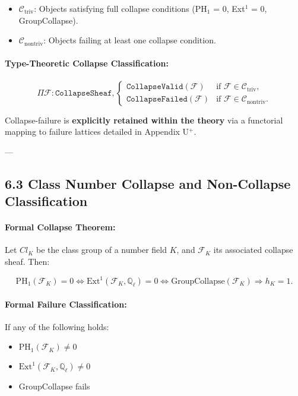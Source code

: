\documentclass[11pt]{article}
\begin{document}
\begin{itemize}
    \item \( \mathcal{C}_{\mathrm{triv}} \): Objects satisfying full collapse conditions (PH$_1$ = 0, Ext$^1$ = 0, GroupCollapse).
    \item \( \mathcal{C}_{\mathrm{nontriv}} \): Objects failing at least one collapse condition.
\end{itemize}

\paragraph{Type-Theoretic Collapse Classification:}

\[
\Pi \mathcal{F} : \texttt{CollapseSheaf},
\begin{cases}
\texttt{CollapseValid}(\mathcal{F}) & \text{if } \mathcal{F} \in \mathcal{C}_{\mathrm{triv}}, \\
\texttt{CollapseFailed}(\mathcal{F}) & \text{if } \mathcal{F} \in \mathcal{C}_{\mathrm{nontriv}}.
\end{cases}
\]

Collapse-failure is \textbf{explicitly retained within the theory} via a functorial mapping to failure lattices detailed in Appendix U$^{+}$.

---

\subsection*{6.3 Class Number Collapse and Non-Collapse Classification}

\paragraph{Formal Collapse Theorem:}
Let \( Cl_K \) be the class group of a number field \( K \), and \( \mathcal{F}_K \) its associated collapse sheaf. Then:

\[
\mathrm{PH}_1(\mathcal{F}_K) = 0 \iff \mathrm{Ext}^1(\mathcal{F}_K, \mathbb{Q}_\ell) = 0 \iff \mathrm{GroupCollapse}(\mathcal{F}_K) \Rightarrow h_K = 1.
\]

\paragraph{Formal Failure Classification:}
If any of the following holds:

\begin{itemize}
    \item \( \mathrm{PH}_1(\mathcal{F}_K) \neq 0 \)
    \item \( \mathrm{Ext}^1(\mathcal{F}_K, \mathbb{Q}_\ell) \neq 0 \)
    \item GroupCollapse fails
\end{itemize}
\end{document}
